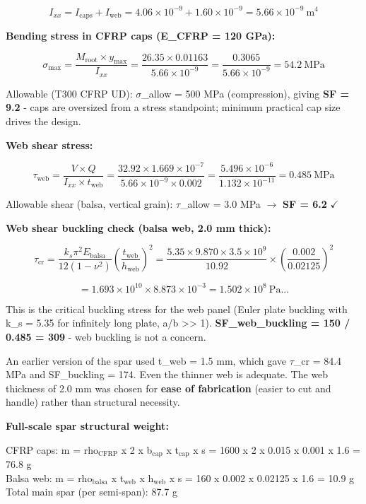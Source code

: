 \documentclass[10pt,a4paper]{article}
\begin{document}
\[
I_{xx} = I_{\text{caps}} + I_{\text{web}} = 4.06 \times 10^{-9} + 1.60 \times 10^{-9} = 5.66 \times 10^{-9}\ \text{m}^4
\]

\textbf{Bending stress in CFRP caps (E\_CFRP = 120 GPa):}

\[
\sigma_{\max} = \frac{M_{\text{root}} \times y_{\max}}{I_{xx}} = \frac{26.35 \times 0.01163}{5.66 \times 10^{-9}} = \frac{0.3065}{5.66 \times 10^{-9}} = 54.2\ \text{MPa}
\]

Allowable (T300 CFRP UD): ${\sigma}$\_allow = 500 MPa (compression), giving \textbf{SF = 9.2} - caps are oversized from a stress standpoint; minimum practical cap size drives the design.

\textbf{Web shear stress:}

\[
\tau_{\text{web}} = \frac{V \times Q}{I_{xx} \times t_{\text{web}}} = \frac{32.92 \times 1.669 \times 10^{-7}}{5.66 \times 10^{-9} \times 0.002} = \frac{5.496 \times 10^{-6}}{1.132 \times 10^{-11}} = 0.485\ \text{MPa}
\]

Allowable shear (balsa, vertical grain): ${\tau}$\_allow = 3.0 MPa ${\rightarrow}$ \textbf{SF = 6.2} $\checkmark $

\textbf{Web shear buckling check (balsa web, 2.0 mm thick):}

\[
\tau_{\text{cr}} = \frac{k_s \pi^2 E_{\text{balsa}}}{12(1-\nu^2)} \left(\frac{t_{\text{web}}}{h_{\text{web}}}\right)^2 = \frac{5.35 \times 9.870 \times 3.5 \times 10^9}{10.92} \times \left(\frac{0.002}{0.02125}\right)^2
\]

\[
= 1.693 \times 10^{10} \times 8.873 \times 10^{-3} = 1.502 \times 10^8\ \text{Pa}... 
\]

This is the critical buckling stress for the web panel (Euler plate buckling with k\_s = 5.35 for infinitely long plate, a/b >> 1). \textbf{SF\_web\_buckling = 150 / 0.485 = 309} - web buckling is not a concern.

An earlier version of the spar used t\_web = 1.5 mm, which gave ${\tau}$\_cr = 84.4 MPa and SF\_buckling = 174. Even the thinner web is adequate. The web thickness of 2.0 mm was chosen for \textbf{ease of fabrication} (easier to cut and handle) rather than structural necessity.

\textbf{Full-scale spar structural weight:}


CFRP caps:  m = rho\(_{\text{CFRP}}\) x 2 x b\(_\text{cap}\) x t\(_\text{cap}\) x s = 1600 x 2 x 0.015 x 0.001 x 1.6 = 76.8 g\\
Balsa web:  m = rho\(_\text{balsa}\) x t\(_\text{web}\) x h\(_\text{web}\) x s     = 160 x 0.002 x 0.02125 x 1.6   = 10.9 g\\
Total main spar (per semi-span): 87.7 g\\
\end{document}
